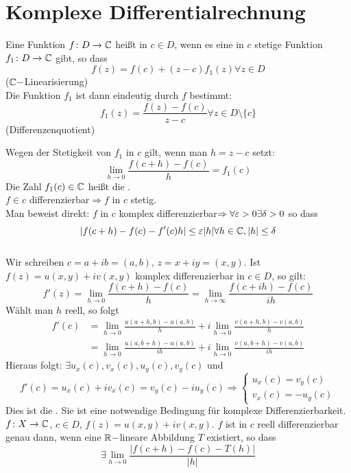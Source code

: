 \newpage
\section{Komplexe Differentialrechnung}
\begin{definition}
	Eine Funktion $ f\colon D\rightarrow\mathbb{C} $ hei\ss t  in $ c\in D $, wenn es eine in $ c $ stetige Funktion $ f_1 \colon D\rightarrow\mathbb{C}$ gibt, so dass
	\[ f(z)=f(c)+(z-c)f_1(z)\forall z\in D \]
	($ \mathbb{C}- $Linearisierung)\\
	Die Funktion $ f_1 $ ist dann eindeutig durch $ f $ bestimmt:
	\[ f_1(z)=\frac{f(z)-f(c)}{z-c}\forall z\in D\setminus\lbrace c\rbrace \]
	(Differenzenquotient)
\end{definition}
Wegen der Stetigkeit von $ f_1 $ in $ c $ gilt, wenn man $ h=z-c $ setzt:
\[ \lim_{h\to 0}\frac{f(c+h)-f(c)}{h}=f_1(c) \]
Die Zahl $ f_1(c)\in\mathbb{C} $ hei\ss t die .\\
$ f\in c $ differenzierbar$ \Rightarrow f$ in $ c $ stetig.\\
Man beweist direkt: $ f $ in $ c $ komplex differenzierbar$ \Rightarrow\forall\varepsilon>0\exists\delta>0 $ so dass
\[ |f(c+h)-f(c)-f'(c)h|\leq\varepsilon|h|\forall h\in\mathbb{C}, |h|\leq\delta \]
\\
Wir schreiben $ c=a+ib=(a,b) $, $ z=x+iy=(x,y) $. Ist $ f(z)=u(x,y)+iv(x,y) $ komplex differenzierbar in $ c\in D $, so gilt:
\[ f'(z)=\lim_{h\to 0}\frac{f(c+h)-f(c)}{h}=\lim_{h\to\infty}\frac{f(c+ih)-f(c)}{ih} \]
W\"ahlt man $ h $ reell, so folgt
\begin{align*} f'(c)&=\lim_{h\to 0}\frac{u(a+h,b)-u(a,b)}{h}+i\lim_{h\to 0}\frac{v(a+h,b)-v(a,b)}{h}\\&=\lim_{h\to 0}\frac{u(a,b+h)-u(a,b)}{ih}+i\lim_{h\to 0}\frac{v(a,b+h)-v(a,b)}{ih} \end{align*}
Hieraus folgt: $ \exists u_x(c),v_x(c),u_y(c),v_y(c) $ und \[ f'(c)=u_x(c)+iv_x(c)=v_y(c)-iu_y(c)\Rightarrow \begin{cases}
u_x(c)=v_y(c)\\v_x(c)=-u_y(c)
\end{cases}\]
Dies ist die . Sie ist eine notwendige Bedingung f\"ur komplexe Differenzierbarkeit.\\
$ f\colon X\rightarrow \mathbb{C} $, $ c\in D $, $ f(z)=u(x,y)+iv(x,y) $. $ f $ ist in $ c $ reell differenzierbar genau dann, wenn eine $ \mathbb{R}- $lineare Abbildung $ T $ existiert, so dass
\[ \exists\lim_{h\to 0}\frac{|f(c+h)-f(c)-T(h)|}{|h|} \]

